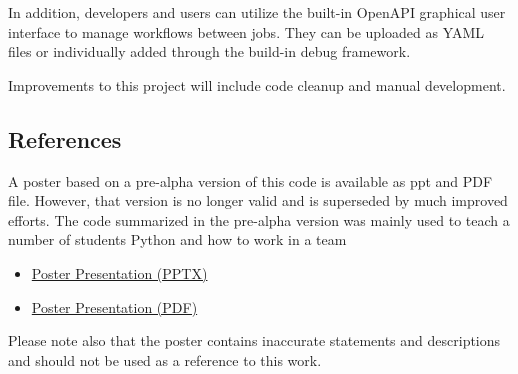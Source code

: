 In addition, developers and users can utilize the built-in OpenAPI
graphical user interface to manage workflows between jobs. They can be
uploaded as YAML files or individually added through the build-in debug
framework.

Improvements to this project will include code cleanup and manual
development.

\subsection{References}\label{references}

A poster based on a pre-alpha version of this code is available as ppt
and PDF file. However, that version is no longer valid and is superseded
by much improved efforts. The code summarized in the pre-alpha version
was mainly used to teach a number of students Python and how to work in
a team

\begin{itemize}
\item
  \href{https://github.com/cloudmesh/cloudmesh-cc/raw/main/documents/analytics-service.pptx}{Poster
  Presentation (PPTX)}
\item
  \href{https://github.com/cloudmesh/cloudmesh-cc/raw/main/documents/analytics-service.pdf}{Poster
  Presentation (PDF)}
\end{itemize}

Please note also that the poster contains inaccurate statements and
descriptions and should not be used as a reference to this work.

